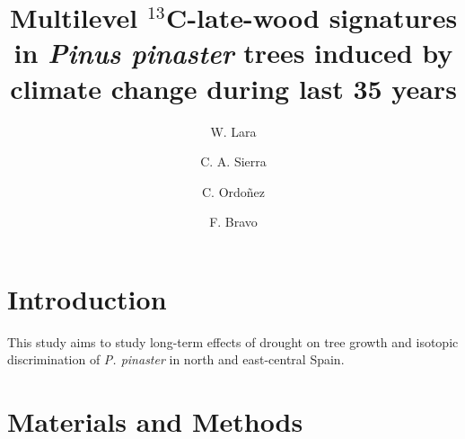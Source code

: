 \documentclass[review,authoryear]{elsarticle}
\begin{document}
\begin{frontmatter}
\title{\textbf{Multilevel $^{13}$C-late-wood signatures in \textit{Pinus pinaster} trees induced by climate change during last 35 years }}

\author[aut1,aut2]{W. Lara}
\author[aut1]{C. A.  Sierra }
\author[aut1]{C. Ordo{\~n}ez}
\author[aut1]{F. Bravo}


\address[aut1]{Sustainable Forest Management Research
  Institute,UVA-INIA, Avenida Madrid, s/n, 34071, Palencia, Spain}

\address[focal]{Department of Biogeochemical Processes, Max Planck
  Institute for Biogeochemistry, Hans-Kn\"oll-Stra\ss e 10, 07745,
  Jena, Germany}

\address[aut2]{Research Center on Ecosystems and Global Change,
  Carbono \& Bosques $($C\&B$)$, Calle 51A, N$^o$ 72-23, Int: 601,
  050034, Medell{\'i}n, Colombia}

\begin{abstract}
\end{abstract}
\begin{keyword}
\end{keyword}
\end{frontmatter}

\linenumbers
\section{Introduction}\label{sec:intro}

This study aims to study long-term effects of drought on tree growth
and isotopic discrimination of \textit{P. pinaster} in north and
east-central Spain.



\section{Materials and Methods}
\end{document}
